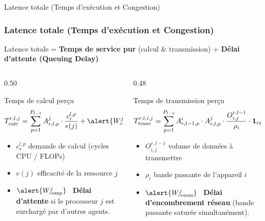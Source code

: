 \documentclass[10pt,aspectratio=169]{beamer}
\begin{document}
\begin{frame}{Latence totale (Temps d'exécution et Congestion)}
\frametitle{Latence totale (Temps d'exécution et Congestion)}

Latence totale = \textbf{Temps de service pur} (calcul \& transmission) + \alert{\textbf{Délai d'attente (Queuing Delay)}}

\bigskip

\begin{columns}[T]  %
\begin{column}{0.50\textwidth}

\begin{block}{Temps de calcul perçu}
\[
T_{\text{calc}}^{r,l,j} = \sum_{p=1}^{P_{l-1}} A^j_{r,l,p} \cdot \frac{c^{l,p}_r}{e(j)} + \alert{W_{\text{comp}}^j}
\]
\end{block}

\begin{itemize}
\item $c^{l,p}_r$ \quad demande de calcul (cycles CPU / FLOPs)
\item $e(j)$ \quad efficacité de la ressource $j$
\item $\alert{W_{\text{comp}}^j}$ \, \textbf{Délai d'attente} si le processeur $j$ est surchargé par d'autres agents.
\end{itemize}

\end{column}

\begin{column}{0.48\textwidth}

\begin{block}{Temps de transmission perçu}
\[
T_{\text{trans}}^{r,l,i,j} = \sum_{p=1}^{P_{l-1}} A^i_{r,{l-1},p} \cdot A^j_{r,l,p} \cdot \frac{O^{r,l-1}_{i,j}}{\rho_i} \cdot \mathbf{1}_{i \neq j} + \alert{W_{\text{comm}}^j}
\]
\end{block}

\begin{itemize}
\item $O^{r,l-1}_{i,j}$ \quad volume de données à transmettre
\item $\rho_i$ \quad bande passante de l'appareil $i$
\item $\alert{W_{\text{comm}}^j}$ \, \textbf{Délai d'encombrement réseau} (bande passante saturée simultanément).
\end{itemize}

\end{column}
\end{columns}

\end{frame}
\end{document}
